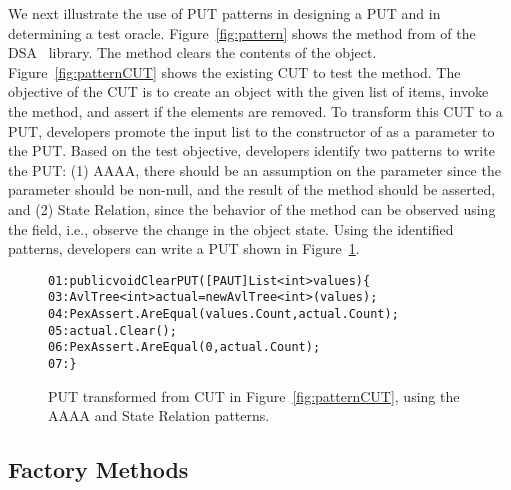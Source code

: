 We next illustrate the use of PUT patterns in designing a PUT and in determining a test oracle. Figure~\ref{fig:pattern} shows the  method from  of the DSA~\cite{dsa} library. The  method clears the contents of the  object. Figure~\ref{fig:patternCUT} shows the existing CUT to test the  method. The objective of the CUT is to create an  object with the given list of items, invoke the  method, and assert if the elements are removed. To transform this CUT to a PUT, developers promote the input list to the constructor of  as a parameter to the PUT. Based on the test objective, developers identify two patterns to write the PUT: (1) AAAA, there should be an assumption on the parameter since the parameter should be non-null, and the result of the  method should be asserted, and (2) State Relation, since the behavior of the  method can be observed using the  field, i.e., observe the change in the object state. Using the identified patterns, developers can write a PUT shown in Figure~\ref{fig:patternPUT}. 

\begin{figure}
\begin{CodeOut}        
\begin{alltt}
01: public void ClearPUT([PAUT]List<int> values) \{
03: \hspace{0.07in}AvlTree<int> actual = new AvlTree<int>(values);
04: \hspace{0.07in}PexAssert.AreEqual(values.Count, actual.Count);
05: \hspace{0.07in}actual.Clear();
06: \hspace{0.07in}PexAssert.AreEqual(0, actual.Count);
07: \}
\end{alltt}
\end{CodeOut}\vspace*{-4ex}
\caption{PUT transformed from CUT in Figure~\ref{fig:patternCUT}, using the AAAA and State Relation patterns.}%
\label{fig:patternPUT}%
\end{figure}

\subsection{Factory Methods}
\label{sec:factory}

